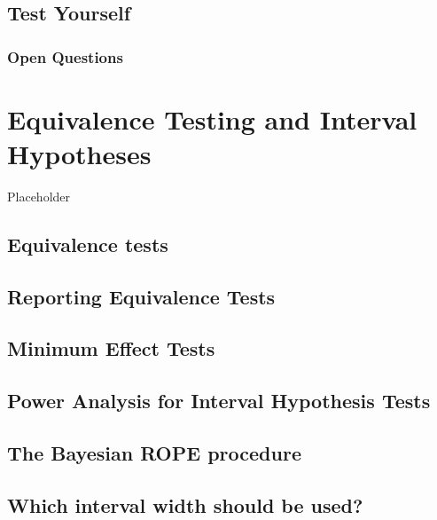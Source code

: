 \documentclass[
  oneside]{krantz}
\begin{document}
\hypertarget{test-yourself-6}{%
\subsection{Test Yourself}\label{test-yourself-6}}

\hypertarget{open-questions-6}{%
\subsubsection{Open Questions}\label{open-questions-6}}

\hypertarget{equivalencetest}{%
\section{Equivalence Testing and Interval
Hypotheses}\label{equivalencetest}}

Placeholder

\hypertarget{equivalence-tests}{%
\subsection{Equivalence tests}\label{equivalence-tests}}

\hypertarget{reporting-equivalence-tests}{%
\subsection{Reporting Equivalence
Tests}\label{reporting-equivalence-tests}}

\hypertarget{MET}{%
\subsection{Minimum Effect Tests}\label{MET}}

\hypertarget{power-analysis-for-interval-hypothesis-tests}{%
\subsection{Power Analysis for Interval Hypothesis
Tests}\label{power-analysis-for-interval-hypothesis-tests}}

\hypertarget{ROPE}{%
\subsection{The Bayesian ROPE procedure}\label{ROPE}}

\hypertarget{whichinterval}{%
\subsection{Which interval width should be used?}\label{whichinterval}}
\end{document}
